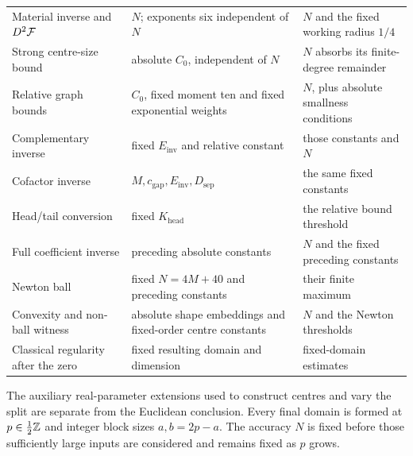 \begin{longtable}{@{}>{\raggedright\arraybackslash}p{}>{\raggedright\arraybackslash}p{}>{\raggedright\arraybackslash}p{}@{}}
Material inverse and $D^2\mathcal F$ & $N$; exponents six independent of $N$ & $N$ and the fixed working radius $1/4$\\
Strong centre-size bound & absolute $C_0$, independent of $N$ & $N$ absorbs its finite-degree remainder\\
Relative graph bounds & $C_0$, fixed moment ten and fixed exponential weights & $N$, plus absolute smallness conditions\\
Complementary inverse & fixed $E_{\mathrm{inv}}$ and relative constant & those constants and $N$\\
Cofactor inverse & $M,c_{\mathrm{gap}},E_{\mathrm{inv}},D_{\mathrm{sep}}$ & the same fixed constants\\
Head/tail conversion & fixed $K_{\mathrm{head}}$ & the relative bound threshold\\
Full coefficient inverse & preceding absolute constants & $N$ and the fixed preceding constants\\
Newton ball & fixed $N=4M+40$ and preceding constants & their finite maximum\\
Convexity and non-ball witness & absolute shape embeddings and fixed-order centre constants & $N$ and the Newton thresholds\\
Classical regularity after the zero & fixed resulting domain and dimension & fixed-domain estimates\\
\bottomrule
\end{longtable}
\endgroup

The auxiliary real-parameter extensions used to construct centres
and vary the split are separate from the Euclidean conclusion.
Every final domain is formed at $p\in\tfrac12\mathbb{Z}$ and integer
block sizes $a,b=2p-a$. The accuracy $N$ is fixed before those
sufficiently large inputs are considered and remains fixed as $p$ grows.
